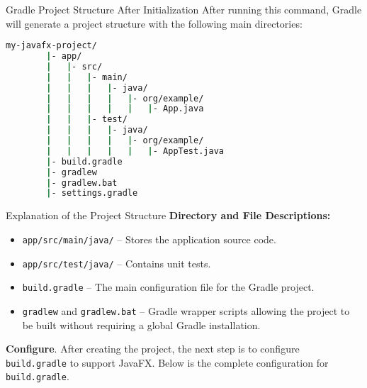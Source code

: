 \documentclass[aspectratio=169, table]{beamer}
\begin{document}
\begin{frame}[fragile]{Gradle Project Structure After Initialization}
	\vspace{20pt}
	After running this command, Gradle will generate a project structure with the following main directories:
	
	\begin{lstlisting}[language=bash, caption=Gradle Project Structure]
		my-javafx-project/
		|- app/
		|   |- src/
		|   |   |- main/
		|   |   |   |- java/
		|   |   |   |   |- org/example/
		|   |   |   |   |   |- App.java
		|   |   |- test/
		|   |   |   |- java/
		|   |   |   |   |- org/example/
		|   |   |   |   |   |- AppTest.java
		|- build.gradle
		|- gradlew
		|- gradlew.bat
		|- settings.gradle
	\end{lstlisting}
\end{frame}

\begin{frame}{Explanation of the Project Structure}
	\vspace{20pt}
	\textbf{Directory and File Descriptions:}
	\begin{itemize}
		\item \texttt{app/src/main/java/} – Stores the application source code.
		\item \texttt{app/src/test/java/} – Contains unit tests.
		\item \texttt{build.gradle} – The main configuration file for the Gradle project.
		\item \texttt{gradlew} and \texttt{gradlew.bat} – Gradle wrapper scripts allowing the project to be built without requiring a global Gradle installation.
	\end{itemize}

		\textbf{Configure}. After creating the project, the next step is to configure \texttt{build.gradle} to support JavaFX. Below is the complete configuration for \texttt{build.gradle}.
\end{frame}
\end{document}
